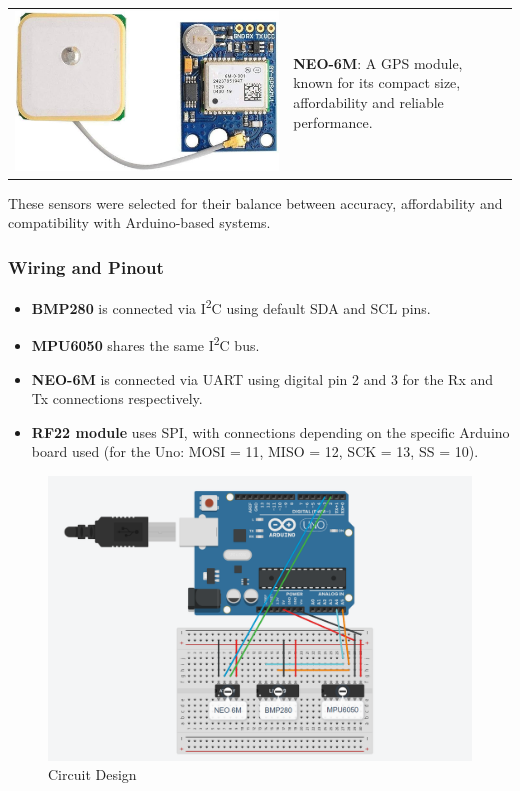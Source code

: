 \documentclass{article}
\begin{document}
\begin{tabular}{@{}m{} m{}@{}}
        \includegraphics[width=0.9\linewidth]{assets/neo_6M_gps.jpg} &
        \textbf{NEO-6M}: A GPS module, known for its compact size, affordability and reliable performance. \\
    \end{tabular}
    
    These sensors were selected for their balance between accuracy, affordability and compatibility with Arduino-based systems.
    
    \subsubsection{Wiring and Pinout}
    \begin{itemize}
        \item \textbf{BMP280} is connected via I\textsuperscript{2}C using default SDA and SCL pins.
        \item \textbf{MPU6050} shares the same I\textsuperscript{2}C bus.
        \item \textbf{NEO-6M} is connected via UART using digital pin 2 and 3 for the Rx and Tx connections respectively.
        \item \textbf{RF22 module} uses SPI, with connections depending on the specific Arduino board used (for the Uno: MOSI = 11, MISO = 12, SCK = 13, SS = 10).
    \end{itemize}
    
    \begin{figure} [h]
            \centering
            \includegraphics[width=0.5\linewidth]{assets/circuit-design.png}
            \caption{Circuit Design}
            \label{fig:enter-label}
    \end{figure}
    \newpage
    
\end{document}
